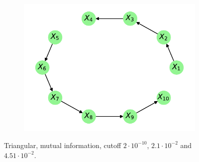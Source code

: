 \documentclass[../Thesis.tex]{subfiles}
\begin{document}
\begin{figure}[h]
\begin{subfigure}[t]{0.49\textwidth}
        \caption{}
    \end{subfigure}
    \\[\baselineskip]
    \begin{subfigure}[t]{0.49\textwidth}
        \centering
        \includegraphics[width=.95\linewidth]{figures/Gaussian Chain Theoretical/Chain graph from triangular G obs - MI - cutoff 4_51e-2.pdf}
        \caption{}
    \end{subfigure}
    \caption{Triangular, mutual information, cutoff $2\cdot 10^{-10}$, $2.1 \cdot 10^{-2}$ and $4.51 \cdot 10^{-2}$.}
    \label{fig:Gaussian chain symmetric G_obs using mutual information different cutoff}
\end{figure}
\end{document}
